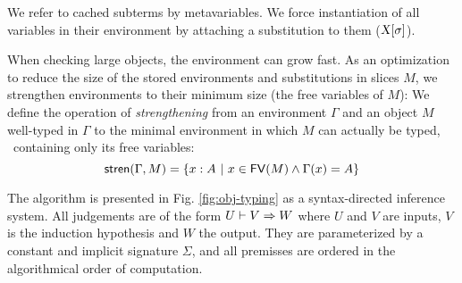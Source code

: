 \documentclass[9pt]{sigplanconf}
\begin{document}
We refer to cached subterms by metavariables. We force instantiation
of all variables in their environment by attaching a substitution to
them (${\text{\textsl{X}}}[{\sigma}]$).

When checking large objects, the environment can grow fast. As an
optimization to reduce the size of the stored environments and
substitutions in slices $M$, we strengthen environments to their
minimum size (the free variables of $M$): We define the operation of
\emph{strengthening} from an environment $\Gamma$ and an object $M$
well-typed in $\Gamma$ to the minimal environment in which $M$ can
actually be typed, \ie\ containing only its free variables:
$$
{\text{\textsf{stren}}}({\Gamma,M}) = \{x : A\ |\ x\in {\text{\textsf{FV}}}({M}) \wedge \Gamma(x)=A\}
$$

The algorithm is presented in Fig. \ref{fig:obj-typing} as a
syntax-directed inference system. All judgements are of the form ${U}\vdash{{V}\Rightarrow{W}}$ where $U$ and $V$ are inputs, $V$ is the induction hypothesis
and $W$ the output. They are parameterized by a constant and implicit
signature $\Sigma$, and all premisses are ordered in the algorithmical
order of computation.
\end{document}

